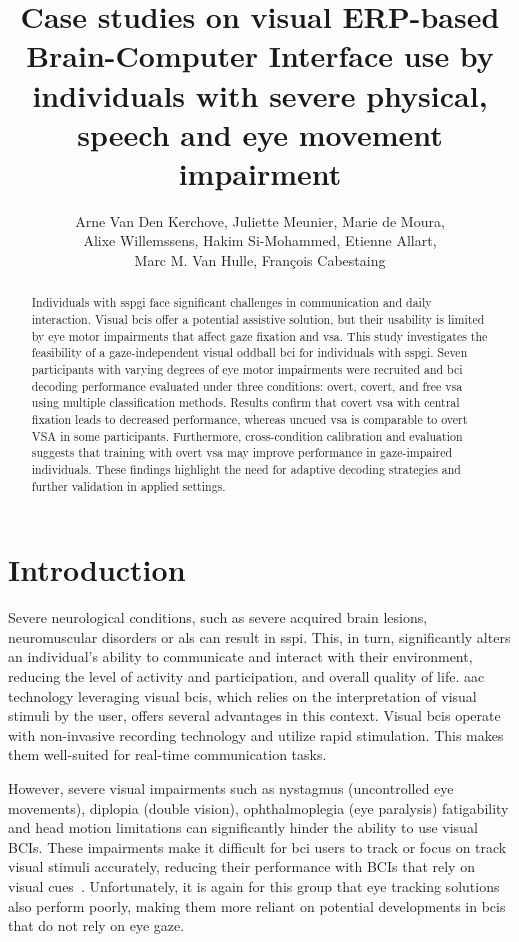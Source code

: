 \documentclass[twocolumn]{article}
\author{
Arne Van Den Kerchove,
Juliette Meunier,
Marie de Moura, \\
Alixe Willemssens,
Hakim Si-Mohammed,
Etienne Allart, \\
Marc M. Van Hulle,
François Cabestaing
}
\title{Case studies on visual ERP-based Brain-Computer Interface use by
individuals with severe physical, speech and eye movement impairment}
\begin{document}
\maketitle

\begin{abstract}
  Individuals with \ac{sspgi} face significant challenges in communication and
  daily interaction. Visual \acp{bci} offer a potential assistive solution, but
  their usability is limited by eye motor impairments that affect gaze fixation
  and \ac{vsa}.
  This study investigates the feasibility of a gaze-independent visual oddball
  \ac{bci} for individuals with \ac{sspgi}.
  Seven participants with varying degrees of eye motor impairments were
  recruited and \ac{bci} decoding performance evaluated under three conditions:
  overt, covert, and free \ac{vsa} using multiple classification methods.
  Results confirm that covert \ac{vsa} with central fixation leads to decreased
  performance, whereas uncued \ac{vsa} is comparable to overt VSA in some
  participants.
  Furthermore, cross-condition calibration and evaluation suggests that training
  with overt \ac{vsa} may improve performance in gaze-impaired individuals.
  These findings highlight the need for adaptive decoding strategies and further
  validation in applied settings.
\end{abstract}

\acresetall
\section{Introduction}
Severe neurological conditions, such as severe acquired brain lesions,
neuromuscular disorders or \ac{als} can result in
\ac{sspi}.
This, in turn, significantly alters an individual's ability to communicate and interact
with their environment, reducing the level of activity and participation,
and overall quality of life.
\Ac{aac} technology leveraging visual \acp{bci},
which relies on the interpretation of visual stimuli by the user,
offers several advantages in this context.
Visual \acp{bci} operate with non-invasive recording technology and utilize rapid stimulation.
This makes them well-suited for real-time communication tasks.

However, severe visual impairments such as nystagmus (uncontrolled eye movements), diplopia (double
vision), ophthalmoplegia (eye paralysis) fatigability and head motion
limitations can significantly hinder the ability to use visual BCIs.
These impairments make it difficult for
\ac{bci} users to track or focus on track visual stimuli accurately, reducing their
performance with BCIs that rely on visual cues~\cite{McCane2014,FriedOken2020,Pasqualotto2015}.
Unfortunately, it is again for this group that eye tracking solutions also
perform poorly, making them more reliant on potential developments in \acp{bci}
that do not rely on eye gaze.
\end{document}
